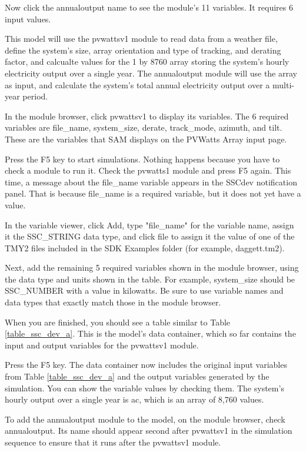 \documentclass{article}
\begin{document}
Now click the annualoutput name to see the module's 11 variables. It requires 6 input values.

This model will use the pvwattsv1 module to read data from a weather file, define the system's size, array orientation and type of tracking, and derating factor, and calcualte values for the 1 by 8760 array storing the system's hourly electricity output over a single year. The annualoutput module will use the array as input, and calculate the system's total annual electricity output over a multi-year period.

In the module browser, click pvwattsv1 to display its variables. The 6 required variables are file\_name, system\_size, derate, track\_mode, azimuth, and tilt. These are the variables that SAM displays on the PVWatts Array input page.

Press the F5 key to start simulations. Nothing happens because you have to check a module to run it. Check the pvwatts1 module and press F5 again. This time, a message about the file\_name variable appears in the SSCdev notification panel. That is because file\_name is a required variable, but it does not yet have a value.

In the variable viewer, click Add, type "file\_name" for the variable name, assign it the SSC\_STRING data type, and click file to assign it the value of one of the TMY2 files included in the SDK Examples folder (for example, daggett.tm2).

Next, add the remaining 5 required variables shown in the module browser, using the data type and units shown in the table. For example, system\_size should be SSC\_NUMBER with a value in kilowatts. Be sure to use variable names and data types that exactly match those in the module browser.

When you are finished, you should see a table similar to Table \ref{table_ssc_dev_a}. This is the model's data container, which so far contains the input and output variables for the pvwattsv1 module.

Press the F5 key. The data container now includes the original input variables from Table \ref{table_ssc_dev_a} and the output variables generated by the simulation. You can show the variable values by checking them. The system's hourly output over a single year is ac, which is an array of 8,760 values.

To add the annualoutput module to the model, on the module browser, check annualoutput. Its name should appear second after pvwattsv1 in the simulation sequence to ensure that it runs after the pvwattsv1 module.
\end{document}
